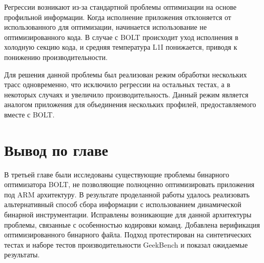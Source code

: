 Регрессии возникают из-за стандартной проблемы оптимизации на основе профильной информации. Когда исполнение приложения отклоняется от использованного для оптимизации, начинается использование не оптимизированного кода. В случае с BOLT происходит уход исполнения в холодную секцию кода, и средняя температура L1I понижается, приводя к понижению производительности. 

Для решения данной проблемы был реализован режим обработки нескольких трасс одновременно, что исключило регрессии на остальных тестах, а в некоторых случаях и увеличило производительность. Данный режим является аналогом приложения для объединения нескольких профилей, предоставляемого вместе с BOLT.


\section{Вывод по главе}\label{sec:ch3/sect5}
В третьей главе были исследованы существующие проблемы бинарного оптимизатора BOLT, не позволяющие полноценно оптимизировать приложения под ARM архитектуру. В результате проделанной работы удалось реализовать альтернативный способ сбора информации с использованием динамической бинарной инструментации. Исправлены возникающие для данной архитектуры проблемы, связанные с особенностью кодировки команд. Добавлена верификация оптимизированного бинарного файла. Подход протестирован на синтетических тестах и наборе тестов производительности GeekBench и показал ожидаемые результаты.

\clearpage
